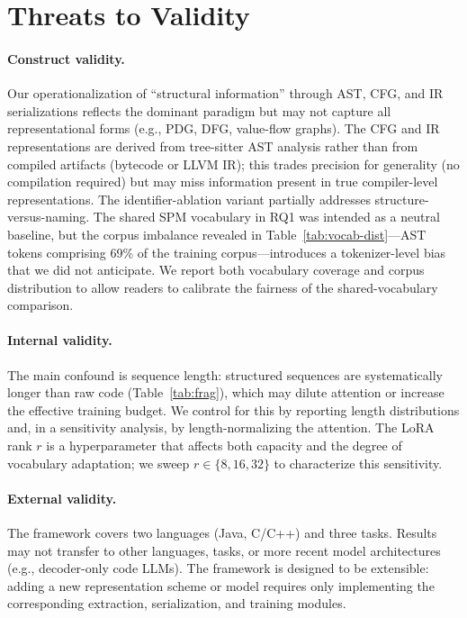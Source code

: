 \documentclass[pdflatex,sn-mathphys,Numbered]{sn-jnl}
\begin{document}
\section{Threats to Validity}\label{sec:threats}

\paragraph{Construct validity.} Our operationalization of ``structural information'' through AST, CFG, and IR serializations reflects the dominant paradigm but may not capture all representational forms (e.g., PDG, DFG, value-flow graphs). The CFG and IR representations are derived from tree-sitter AST analysis rather than from compiled artifacts (bytecode or LLVM IR); this trades precision for generality (no compilation required) but may miss information present in true compiler-level representations. The identifier-ablation variant partially addresses structure-versus-naming. The shared SPM vocabulary in RQ1 was intended as a neutral baseline, but the corpus imbalance revealed in Table~\ref{tab:vocab-dist}---AST tokens comprising 69\% of the training corpus---introduces a tokenizer-level bias that we did not anticipate. We report both vocabulary coverage and corpus distribution to allow readers to calibrate the fairness of the shared-vocabulary comparison.

\paragraph{Internal validity.} The main confound is sequence length: structured sequences are systematically longer than raw code (Table~\ref{tab:frag}), which may dilute attention or increase the effective training budget. We control for this by reporting length distributions and, in a sensitivity analysis, by length-normalizing the attention. The LoRA rank $r$ is a hyperparameter that affects both capacity and the degree of vocabulary adaptation; we sweep $r \in \{8, 16, 32\}$ to characterize this sensitivity.

\paragraph{External validity.} The framework covers two languages (Java, C/C++) and three tasks. Results may not transfer to other languages, tasks, or more recent model architectures (e.g., decoder-only code LLMs). The framework is designed to be extensible: adding a new representation scheme or model requires only implementing the corresponding extraction, serialization, and training modules.
\end{document}
